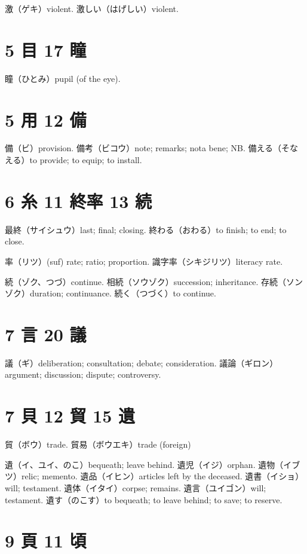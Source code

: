 激（ゲキ）violent.
激しい（はげしい）violent.

\section{5 目 17 瞳}

瞳（ひとみ）pupil (of the eye).

\section{5 用 12 備}

備（ビ）provision.
備考（ビコウ）note; remarks; nota bene; NB.
備える（そなえる）to provide; to equip; to install.

\section{6 糸 11 終率 13 続}

最終（サイシュウ）last; final; closing.
終わる（おわる）to finish; to end; to close.

率（リツ）(suf) rate; ratio; proportion.
識字率（シキジリツ）literacy rate.

続（ゾク、つづ）continue.
相続（ソウゾク）succession; inheritance.
存続（ソンゾク）duration; continuance.
続く（つづく）to continue.

\section{7 言 20 議}

議（ギ）deliberation; consultation; debate; consideration.
議論（ギロン）argument; discussion; dispute; controversy.

\section{7 貝 12 貿 15 遺}

貿（ボウ）trade.
貿易（ボウエキ）trade (foreign)

遺（イ、ユイ、のこ）bequeath; leave behind.
遺児（イジ）orphan.
遺物（イブツ）relic; memento.
遺品（イヒン）articles left by the deceased.
遺書（イショ）will; testament.
遺体（イタイ）corpse; remains.
遺言（ユイゴン）will; testament.
遺す（のこす）to bequeath; to leave behind; to save; to reserve.

\section{9 頁 11 頃}


